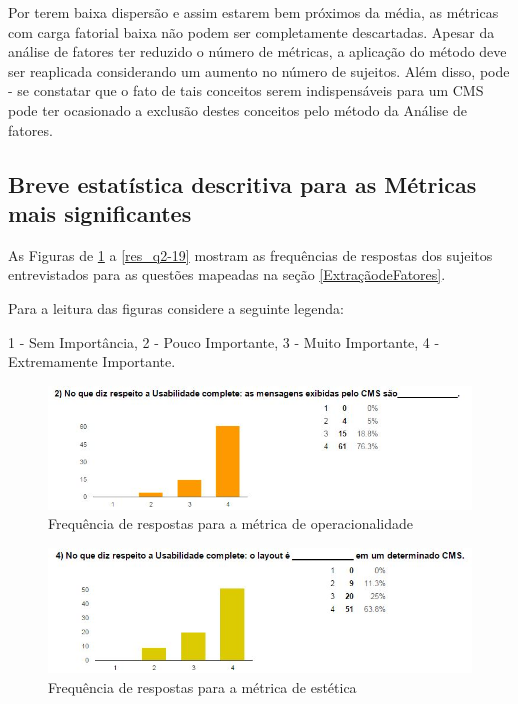 Por terem baixa dispersão e assim estarem bem próximos da média, as métricas com carga fatorial baixa não podem ser completamente descartadas. Apesar da análise de fatores ter reduzido o número de métricas, a aplicação do método deve ser reaplicada considerando um aumento no número de sujeitos. Além disso, pode - se constatar que o fato de tais conceitos serem indispensáveis para um CMS pode ter ocasionado a exclusão destes conceitos pelo método da Análise de fatores.  

\subsection{Breve estatística descritiva para as Métricas mais significantes}    

As Figuras de \ref{res_q2-2} a \ref{res_q2-19} mostram as frequências de respostas dos sujeitos entrevistados para as questões mapeadas na seção \ref{ExtraçãodeFatores}.

Para a leitura das figuras considere a seguinte legenda:

 1 - Sem Importância, 2 - Pouco Importante, 3 - Muito Importante, 4 - Extremamente Importante.
\begin{figure}[!htb]
\centering
\includegraphics[keepaspectratio=true,scale=0.85]{figuras/Ques_2/q2_fig.jpg}
\caption{Frequência de respostas para a métrica de operacionalidade}
\label{res_q2-2}
\end{figure}

\begin{figure}[!htb]
\centering
\includegraphics[keepaspectratio=true,scale=0.85]{figuras/Ques_2/q4_fig.jpg}
\caption{Frequência de respostas para a métrica de estética}
\label{res_q2-4}
\end{figure}


